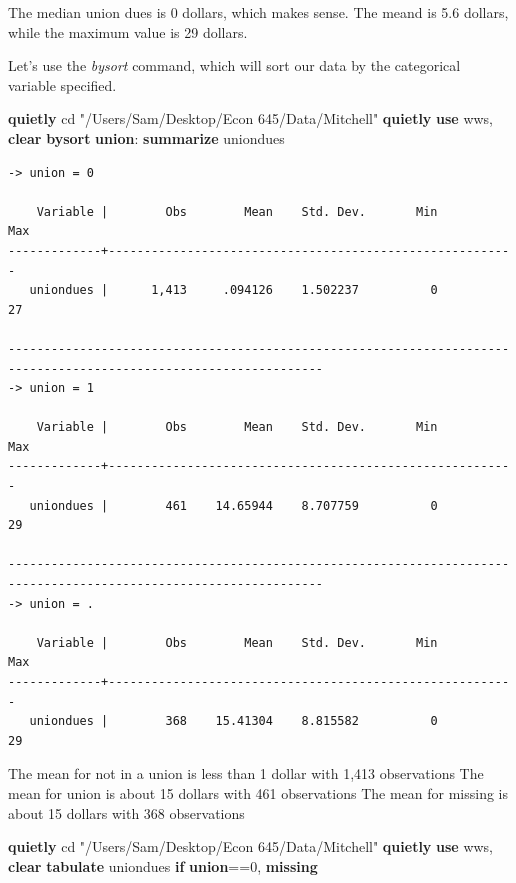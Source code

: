 \documentclass[
]{book}
\newenvironment{Shaded}{\begin{snugshade}}{\end{snugshade}}
\newcommand{\FunctionTok}[1]{\textcolor[rgb]{0.13,0.29,0.53}{\textbf{#1}}}
\newcommand{\KeywordTok}[1]{\textcolor[rgb]{0.13,0.29,0.53}{\textbf{#1}}}
\newcommand{\NormalTok}[1]{#1}
\newcommand{\StringTok}[1]{\textcolor[rgb]{0.31,0.60,0.02}{#1}}
\begin{document}
The median union dues is 0 dollars, which makes sense. The meand is 5.6 dollars, while the maximum value is 29 dollars.

Let's use the \emph{bysort} command, which will sort our data by the categorical variable specified.

\begin{Shaded}
\begin{Highlighting}[]
\KeywordTok{quietly}\NormalTok{ cd }\StringTok{"/Users/Sam/Desktop/Econ 645/Data/Mitchell"}
\KeywordTok{quietly} \KeywordTok{use}\NormalTok{ wws, }\KeywordTok{clear}
\KeywordTok{bysort} \KeywordTok{union}\NormalTok{: }\KeywordTok{summarize}\NormalTok{ uniondues}
\end{Highlighting}
\end{Shaded}

\begin{verbatim}
-> union = 0

    Variable |        Obs        Mean    Std. Dev.       Min        Max
-------------+---------------------------------------------------------
   uniondues |      1,413     .094126    1.502237          0         27

------------------------------------------------------------------------------------------------------------------
-> union = 1

    Variable |        Obs        Mean    Std. Dev.       Min        Max
-------------+---------------------------------------------------------
   uniondues |        461    14.65944    8.707759          0         29

------------------------------------------------------------------------------------------------------------------
-> union = .

    Variable |        Obs        Mean    Std. Dev.       Min        Max
-------------+---------------------------------------------------------
   uniondues |        368    15.41304    8.815582          0         29
\end{verbatim}

The mean for not in a union is less than 1 dollar with 1,413 observations
The mean for union is about 15 dollars with 461 observations
The mean for missing is about 15 dollars with 368 observations

\begin{Shaded}
\begin{Highlighting}[]
\KeywordTok{quietly}\NormalTok{ cd }\StringTok{"/Users/Sam/Desktop/Econ 645/Data/Mitchell"}
\KeywordTok{quietly} \KeywordTok{use}\NormalTok{ wws, }\KeywordTok{clear}
\KeywordTok{tabulate}\NormalTok{ uniondues }\KeywordTok{if} \KeywordTok{union}\NormalTok{==0, }\FunctionTok{missing}
\end{Highlighting}
\end{Shaded}
\end{document}
